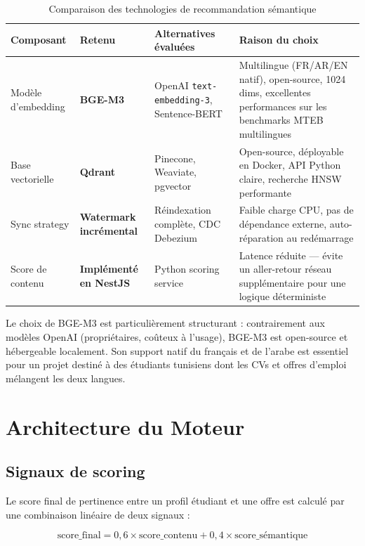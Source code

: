 ﻿\documentclass[12pt,a4paper]{report}
\begin{document}
\begin{table}[H]
\centering
\begin{tabularx}{\textwidth}{p{3cm}p{3cm}p{4cm}X}
\toprule
\textbf{Composant} & \textbf{Retenu} & \textbf{Alternatives évaluées} & \textbf{Raison du choix} \\
\midrule
Modèle d'embedding & \textbf{BGE-M3} & OpenAI \texttt{text-embedding-3}, Sentence-BERT & Multilingue (FR/AR/EN natif), open-source, 1024 dims, excellentes performances sur les benchmarks MTEB multilingues \\
Base vectorielle & \textbf{Qdrant} & Pinecone, Weaviate, pgvector & Open-source, déployable en Docker, API Python claire, recherche HNSW performante \\
Sync strategy & \textbf{Watermark incrémental} & Réindexation complète, CDC Debezium & Faible charge CPU, pas de dépendance externe, auto-réparation au redémarrage \\
Score de contenu & \textbf{Implémenté en NestJS} & Python scoring service & Latence réduite — évite un aller-retour réseau supplémentaire pour une logique déterministe \\
\bottomrule
\end{tabularx}
\caption{Comparaison des technologies de recommandation sémantique}
\end{table}

Le choix de BGE-M3 est particulièrement structurant : contrairement aux modèles OpenAI (propriétaires, coûteux à l'usage), BGE-M3 est open-source et hébergeable localement. Son support natif du français et de l'arabe est essentiel pour un projet destiné à des étudiants tunisiens dont les CVs et offres d'emploi mélangent les deux langues.

\section{Architecture du Moteur}

\subsection{Signaux de scoring}

Le score final de pertinence entre un profil étudiant et une offre est calculé par une combinaison linéaire de deux signaux :

\begin{equation}
\text{score\_final} = 0{,}6 \times \text{score\_contenu} + 0{,}4 \times \text{score\_sémantique}
\label{eq:score}
\end{equation}
\end{document}
